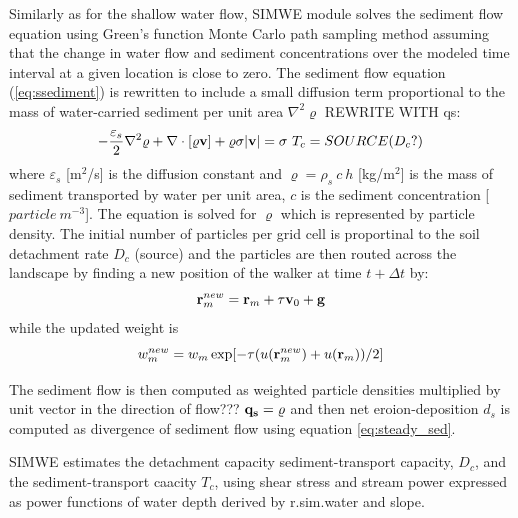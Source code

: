 \documentclass[gmd, manuscript]{copernicus}
\begin{document}
Similarly as for the shallow water flow, SIMWE module solves the sediment flow 
equation using Green's function Monte Carlo path sampling method
assuming that the change in water flow
and sediment concentrations over the modeled time interval at a given location is close to zero.
The sediment flow equation (\ref{eq:ssediment}) 
%
is rewritten to include a small diffusion term proportional to the 
mass of water-carried sediment per unit area $\nabla^2 \varrho$ REWRITE WITH qs:
\begin{equation}
\label{eq:difsedim}
-{\varepsilon_s \over 2}\nabla^2 \varrho
+ \nabla\cdot [\varrho {\bf v}]
 + \varrho \sigma |{\bf v}|
= \sigma~T_c = SOURCE (D_c?)
\end{equation}
where  $\varepsilon_s$ [m$^2$/s] is the diffusion constant and
$\varrho = \rho_s~c~h$ [kg/m$^2$] is
the mass of sediment transported by water per unit area, $c$ is the sediment concentration [$\unit{particle~m^{-3}}$].
The equation is solved for $\varrho$ which is represented by particle density.
The initial number of particles per grid cell is proportinal to the soil detachment rate $D_c$
(source) and the particles are then routed across the landscape by finding a new position 
of the walker at time $t + \Delta t$ by:
\begin{equation}
{\bf r}_m^{new}={\bf r}_m + \tau {\bf v}_0 + {\bf g}
\end{equation}
 while the updated weight is
\begin{equation}
w_m^{new}=w_m \exp[-\tau(u({\bf r}_m^{new})+u({\bf r}_m))/2]
\end{equation}

The sediment flow is then computed as weighted particle densities 
multiplied by unit vector in the direction of flow???
${\bf q_s} = \varrho$ and then net eroion-deposition $d_s$ 
is computed as divergence of sediment flow using equation \ref{eq:steady_sed}.

SIMWE estimates the detachment capacity sediment-transport capacity, $D_c $, and 
the sediment-transport caacity $T_c $, 
using shear stress and stream power \citep{Mitasova2001}
expressed as power functions of water depth derived by r.sim.water and slope. 
\end{document}
